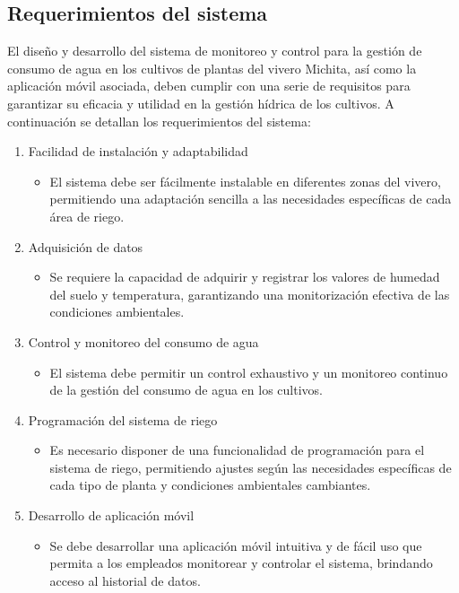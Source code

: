\subsection{Requerimientos del sistema}
El diseño y desarrollo del sistema de monitoreo y control para la gestión de consumo de agua en los cultivos de plantas del vivero Michita, así como la aplicación móvil asociada, deben cumplir con una serie de requisitos para garantizar su eficacia y utilidad en la gestión hídrica de los cultivos. A continuación se detallan los requerimientos del sistema:

\begin{enumerate}
	\item Facilidad de instalación y adaptabilidad
	    \begin{itemize}
		    \item El sistema debe ser fácilmente instalable en diferentes zonas del vivero, permitiendo una adaptación sencilla a las necesidades específicas de cada área de riego.
	    \end{itemize}
	\item Adquisición de datos
	    \begin{itemize}
		    \item Se requiere la capacidad de adquirir y registrar los valores de humedad del suelo y temperatura, garantizando una monitorización efectiva de las condiciones ambientales.
	    \end{itemize}
	\item Control y monitoreo del consumo de agua
	    \begin{itemize}
		    \item El sistema debe permitir un control exhaustivo y un monitoreo continuo de la gestión del consumo de agua en los cultivos.
	    \end{itemize}
	\item Programación del sistema de riego
	    \begin{itemize}
		    \item Es necesario disponer de una funcionalidad de programación para el sistema de riego, permitiendo ajustes según las necesidades específicas de cada tipo de planta y condiciones ambientales cambiantes.
	    \end{itemize}
	\item Desarrollo de aplicación móvil
	    \begin{itemize}
		    \item Se debe desarrollar una aplicación móvil intuitiva y de fácil uso que permita a los empleados monitorear y controlar el sistema, brindando acceso al historial de datos. 
	    \end{itemize}
\end{enumerate}